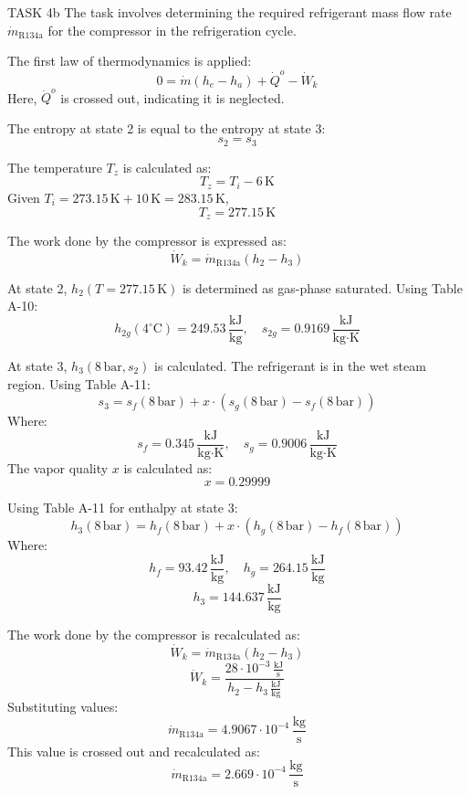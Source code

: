 TASK 4b  
The task involves determining the required refrigerant mass flow rate \( \dot{m}_{\text{R134a}} \) for the compressor in the refrigeration cycle.

The first law of thermodynamics is applied:  
\[
0 = \dot{m}(h_e - h_a) + \dot{Q}^o - \dot{W}_k
\]  
Here, \( \dot{Q}^o \) is crossed out, indicating it is neglected.

The entropy at state 2 is equal to the entropy at state 3:  
\[
s_2 = s_3
\]

The temperature \( T_z \) is calculated as:  
\[
T_z = T_i - 6 \, \text{K}
\]  
Given \( T_i = 273.15 \, \text{K} + 10 \, \text{K} = 283.15 \, \text{K} \),  
\[
T_z = 277.15 \, \text{K}
\]

The work done by the compressor is expressed as:  
\[
\dot{W}_k = \dot{m}_{\text{R134a}} (h_2 - h_3)
\]

At state 2, \( h_2(T = 277.15 \, \text{K}) \) is determined as gas-phase saturated. Using Table A-10:  
\[
h_{2g}(4^\circ\text{C}) = 249.53 \, \frac{\text{kJ}}{\text{kg}}, \quad s_{2g} = 0.9169 \, \frac{\text{kJ}}{\text{kg·K}}
\]

At state 3, \( h_3(8 \, \text{bar}, s_2) \) is calculated. The refrigerant is in the wet steam region. Using Table A-11:  
\[
s_3 = s_f(8 \, \text{bar}) + x \cdot (s_g(8 \, \text{bar}) - s_f(8 \, \text{bar}))
\]  
Where:  
\[
s_f = 0.345 \, \frac{\text{kJ}}{\text{kg·K}}, \quad s_g = 0.9006 \, \frac{\text{kJ}}{\text{kg·K}}
\]  
The vapor quality \( x \) is calculated as:  
\[
x = 0.29999
\]

Using Table A-11 for enthalpy at state 3:  
\[
h_3(8 \, \text{bar}) = h_f(8 \, \text{bar}) + x \cdot (h_g(8 \, \text{bar}) - h_f(8 \, \text{bar}))
\]  
Where:  
\[
h_f = 93.42 \, \frac{\text{kJ}}{\text{kg}}, \quad h_g = 264.15 \, \frac{\text{kJ}}{\text{kg}}
\]  
\[
h_3 = 144.637 \, \frac{\text{kJ}}{\text{kg}}
\]

The work done by the compressor is recalculated as:  
\[
\dot{W}_k = \dot{m}_{\text{R134a}} (h_2 - h_3)
\]  
\[
\dot{W}_k = \frac{28 \cdot 10^{-3} \, \frac{\text{kJ}}{\text{s}}}{h_2 - h_3 \, \frac{\text{kJ}}{\text{kg}}}
\]  
Substituting values:  
\[
\dot{m}_{\text{R134a}} = 4.9067 \cdot 10^{-4} \, \frac{\text{kg}}{\text{s}}
\]  
This value is crossed out and recalculated as:  
\[
\dot{m}_{\text{R134a}} = 2.669 \cdot 10^{-4} \, \frac{\text{kg}}{\text{s}}
\]